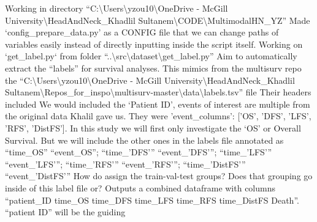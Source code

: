 \documentclass{article}%
\begin{document}
%
Working in directory “C:\textbackslash{}Users\textbackslash{}yzou10\textbackslash{}OneDrive {-} McGill University\textbackslash{}HeadAndNeck\_Khadlil Sultanem\textbackslash{}CODE\textbackslash{}MultimodalHN\_YZ” %
\newline%
\newline%
%
Made ‘config\_prepare\_data.py’ as a CONFIG file that we can change paths of variables easily instead of directly inputting inside the script itself. %
\newline%
\newline%
%
Working on `get\_label.py` from folder “..\textbackslash{}src\textbackslash{}dataset\textbackslash{}get\_label.py”%
\newline%
\newline%
%
Aim to automatically extract the  “labels” for survival analyses. %
\newline%
\newline%
%
This mimics from the multisurv repo the “C:\textbackslash{}Users\textbackslash{}yzou10\textbackslash{}OneDrive {-} McGill University\textbackslash{}HeadAndNeck\_Khadlil Sultanem\textbackslash{}Repos\_for\_inspo\textbackslash{}multisurv{-}master\textbackslash{}data\textbackslash{}labels.tsv” file%
\newline%
\newline%
%
Their headers included %
\newline%
\newline%
%
We would included the ‘Patient ID’, events of interest are multiple from the original data Khalil gave us. They were 'event\_columns': {[}'OS', 'DFS', 'LFS', 'RFS', 'DistFS'{]}.%
\newline%
\newline%
%
In this study we will first only investigate the ‘OS’ or Overall Survival. But we will include the other ones in the labels file annotated as “time\_OS” “event\_OS”; “time\_'DFS'” “event\_'DFS'”; “time\_'LFS'” “event\_'LFS'”; “time\_'RFS'” “event\_'RFS'”; “time\_'DistFS'” “event\_'DistFS'”%
\newline%
\newline%
%
How do assign the train{-}val{-}test groups? Does that grouping go inside of this label file or?  %
\newline%
\newline%
%
Outputs a combined dataframe with columns “patient\_ID     time\_OS    time\_DFS    time\_LFS    time\_RFS  time\_DistFS  Death”. “patient ID” will be the guiding %
\newline%
\newline%
\end{document}
